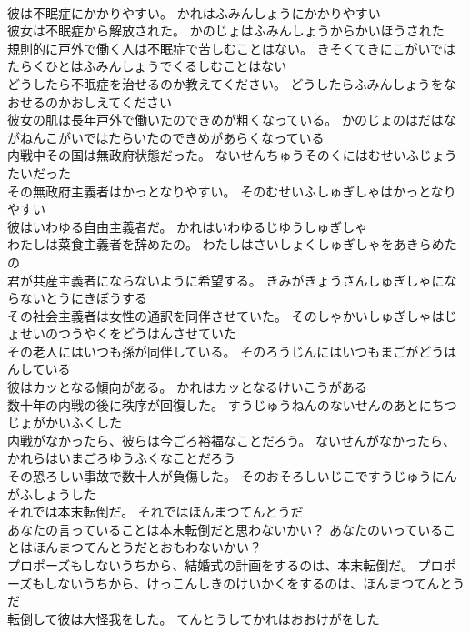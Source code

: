 \documentclass[8pt]{extreport}
\begin{document}
\begin{CJK}{UTF8}{min}
\\	彼は不眠症にかかりやすい。	かれはふみんしょうにかかりやすい 
\\	彼女は不眠症から解放された。	かのじょはふみんしょうからかいほうされた 
\\	規則的に戸外で働く人は不眠症で苦しむことはない。	きそくてきにこがいではたらくひとはふみんしょうでくるしむことはない 
\\	どうしたら不眠症を治せるのか教えてください。	どうしたらふみんしょうをなおせるのかおしえてください 
\\	彼女の肌は長年戸外で働いたのできめが粗くなっている。	かのじょのはだはながねんこがいではたらいたのできめがあらくなっている 
\\	内戦中その国は無政府状態だった。	ないせんちゅうそのくにはむせいふじょうたいだった 
\\	その無政府主義者はかっとなりやすい。	そのむせいふしゅぎしゃはかっとなりやすい 
\\	彼はいわゆる自由主義者だ。	かれはいわゆるじゆうしゅぎしゃ 
\\	わたしは菜食主義者を辞めたの。	わたしはさいしょくしゅぎしゃをあきらめたの 
\\	君が共産主義者にならないように希望する。	きみがきょうさんしゅぎしゃにならないとうにきぼうする 
\\	その社会主義者は女性の通訳を同伴させていた。	そのしゃかいしゅぎしゃはじょせいのつうやくをどうはんさせていた 
\\	その老人にはいつも孫が同伴している。	そのろうじんにはいつもまごがどうはんしている 
\\	彼はカッとなる傾向がある。	かれはカッとなるけいこうがある 
\\	数十年の内戦の後に秩序が回復した。	すうじゅうねんのないせんのあとにちつじょがかいふくした 
\\	内戦がなかったら、彼らは今ごろ裕福なことだろう。	ないせんがなかったら、かれらはいまごろゆうふくなことだろう 
\\	その恐ろしい事故で数十人が負傷した。	そのおそろしいじこですうじゅうにんがふしょうした 
\\	それでは本末転倒だ。	それではほんまつてんとうだ 
\\	あなたの言っていることは本末転倒だと思わないかい？	あなたのいっていることはほんまつてんとうだとおもわないかい？ 
\\	プロポーズもしないうちから、結婚式の計画をするのは、本末転倒だ。	プロポーズもしないうちから、けっこんしきのけいかくをするのは、ほんまつてんとうだ 
\\	転倒して彼は大怪我をした。	てんとうしてかれはおおけがをした 

\end{CJK}
\end{document}
